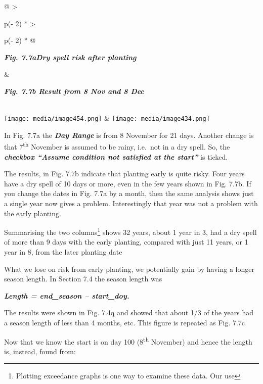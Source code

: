 \documentclass[
  letterpaper,
  DIV=11,
  numbers=noendperiod]{scrreprt}
\begin{document}
\begin{longtable}[]{@{}
  >{\raggedright\arraybackslash}p{(\columnwidth - 2\tabcolsep) * }
  >{\raggedright\arraybackslash}p{(\columnwidth - 2\tabcolsep) * }@{}}
\toprule\noalign{}
\begin{minipage}[b]{\linewidth}\raggedright
\textbf{\emph{Fig. 7.7aDry spell risk after planting}}
\end{minipage} & \begin{minipage}[b]{\linewidth}\raggedright
\textbf{\emph{Fig. 7.7b Result from 8 Nov and 8 Dec}}
\end{minipage} \\
\midrule\noalign{}
\endhead
\bottomrule\noalign{}
\endlastfoot
\texttt{[image: media/image454.png]} &
\texttt{[image: media/image434.png]} \\
\end{longtable}

In Fig. 7.7a the \textbf{\emph{Day Range}} is from 8 November for 21
days. Another change is that 7\textsuperscript{th} November is assumed
to be rainy, i.e.~not in a dry spell. So, the \textbf{\emph{checkbox
``Assume condition not satisfied at the start''}} is ticked.

The results, in Fig. 7.7b indicate that planting early is quite risky.
Four years have a dry spell of 10 days or more, even in the few years
shown in Fig. 7.7b. If you change the dates in Fig. 7.7a by a month,
then the same analysis shows just a single year now gives a problem.
Interestingly that year was not a problem with the early planting.

Summarising the two columns\footnote{Plotting exceedance graphs is one
  way to examine these data. Our use} shows 32 years, about 1 year in 3,
had a dry spell of more than 9 days with the early planting, compared
with just 11 years, or 1 year in 8, from the later planting date

What we lose on risk from early planting, we potentially gain by having
a longer season length. In Section 7.4 the season length was

\textbf{\emph{Length = end\_season -- start\_doy.}}

The results were shown in Fig. 7.4q and showed that about 1/3 of the
years had a season length of less than 4 months, etc. This figure is
repeated as Fig. 7.7c

Now that we know the start is on day 100 (8\textsuperscript{th}
November) and hence the length is, instead, found from:
\end{document}
